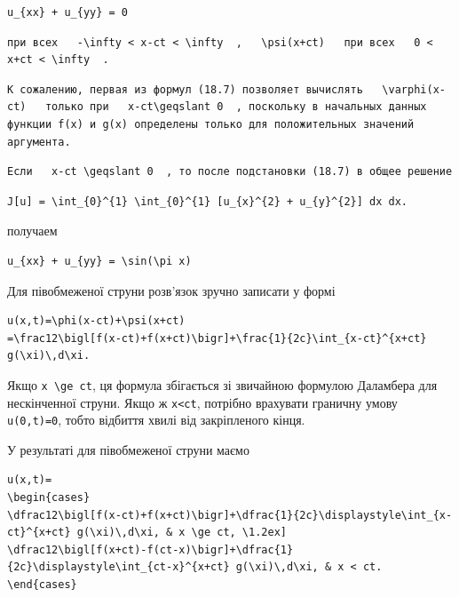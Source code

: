 \documentclass[
  ukrainian,
]{article}
\begin{document}
\begin{verbatim}
u_{xx} + u_{yy} = 0
\end{verbatim}

\begin{verbatim}
при всех   -\infty < x-ct < \infty  ,   \psi(x+ct)   при всех   0 < x+ct < \infty  .
\end{verbatim}

\begin{verbatim}
К сожалению, первая из формул (18.7) позволяет вычислять   \varphi(x-ct)   только при   x-ct\geqslant 0  , поскольку в начальных данных функции f(x) и g(x) определены только для положительных значений аргумента.
\end{verbatim}

\begin{verbatim}
Если   x-ct \geqslant 0  , то после подстановки (18.7) в общее решение
\end{verbatim}

\begin{verbatim}
J[u] = \int_{0}^{1} \int_{0}^{1} [u_{x}^{2} + u_{y}^{2}] dx dx.
\end{verbatim}

получаем

\begin{verbatim}
u_{xx} + u_{yy} = \sin(\pi x)
\end{verbatim}

Для півобмеженої струни розв'язок зручно записати у формі

\begin{verbatim}
u(x,t)=\phi(x-ct)+\psi(x+ct)
=\frac12\bigl[f(x-ct)+f(x+ct)\bigr]+\frac{1}{2c}\int_{x-ct}^{x+ct} g(\xi)\,d\xi.
\end{verbatim}

Якщо \texttt{x\ \textbackslash{}ge\ ct}, ця формула збігається зі
звичайною формулою Даламбера для нескінченної струни. Якщо ж
\texttt{x\textless{}ct}, потрібно врахувати граничну умову
\texttt{u(0,t)=0}, тобто відбиття хвилі від закріпленого кінця.

У результаті для півобмеженої струни маємо

\begin{verbatim}
u(x,t)=
\begin{cases}
\dfrac12\bigl[f(x-ct)+f(x+ct)\bigr]+\dfrac{1}{2c}\displaystyle\int_{x-ct}^{x+ct} g(\xi)\,d\xi, & x \ge ct, \1.2ex]
\dfrac12\bigl[f(x+ct)-f(ct-x)\bigr]+\dfrac{1}{2c}\displaystyle\int_{ct-x}^{x+ct} g(\xi)\,d\xi, & x < ct.
\end{cases}
\end{verbatim}
\end{document}
